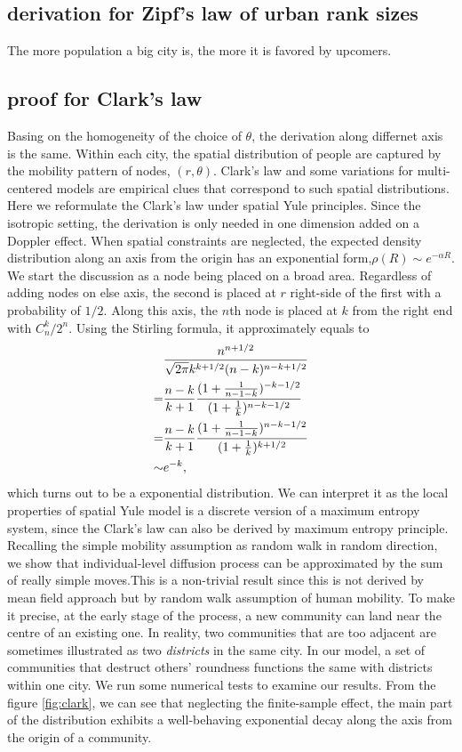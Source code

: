 \documentclass[aps,prl]{revtex4-1}
\begin{document}
\subsection{derivation for Zipf's law of urban rank sizes}

The more population a big city is, the more it is favored by upcomers.

\subsection{proof for Clark's law}

Basing on the homogeneity of the choice of $\theta$, the derivation along differnet axis is the same. Within each city, the spatial distribution of people are captured by the mobility pattern of nodes, $(r,\theta)$. Clark's law\cite{clark1951urban} and some variations for multi-centered models\cite{griffith1981modelling} are empirical clues that correspond to such spatial distributions. Here we reformulate the Clark's law under spatial Yule principles. Since the isotropic setting, the derivation is only needed in one dimension added on a Doppler effect. When spatial constraints are neglected, the expected density distribution along an axis from the origin has an exponential form,$\rho (R)\sim e^{-\alpha R}$. We start the discussion as a node being placed on a broad area. Regardless of adding nodes on else axis, the second is placed at $r$ right-side of the first with a probability of $1/2$. Along this axis, the $n$th node is placed at $k$ from the right end with $C_n^k/2^n$. Using the Stirling formula, it approximately equals to \begin{align}
    & \frac{n^{n+1/2}}{\sqrt{2\pi}k^{k+1/2}(n-k)^{n-k+1/2}}\notag                         \\
=    & \frac{n-k}{k+1}\frac{(1+\frac{1}{n-1-k})^{-k-1/2}}{(1+\frac{1}{k})^{n-k-1/2}}\notag \\
=    & \frac{n-k}{k+1}\frac{(1+\frac{1}{n-1-k})^{n-k-1/2}}{(1+\frac{1}{k})^{k+1/2}}\notag  \\
\sim & e^{-k},
\end{align}
which turns out to be a exponential distribution. We can interpret it as the local properties of spatial Yule model is a discrete version of a maximum entropy system, since the Clark's law can also be derived by maximum entropy principle\cite{merity2009accurate}. Recalling the simple mobility assumption as random walk in random direction, we show that individual-level diffusion process can be approximated by the sum of really simple moves.This is a non-trivial result since this is not derived by mean field approach but by random walk assumption of human mobility. To make it precise, at the early stage of the process, a new community can land near the centre of an existing one. In reality, two communities that are too adjacent are sometimes illustrated as two \emph{districts} in the same city. In our model, a set of communities that destruct others' roundness functions the same with districts within one city. We run some numerical tests to examine our results. From the figure \ref{fig:clark}, we can see that neglecting the finite-sample effect, the main part of the distribution exhibits a well-behaving exponential decay along the axis from the origin of a community.
\end{document}
